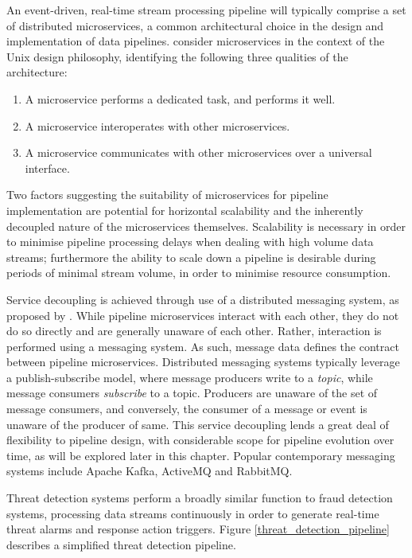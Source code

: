 An event-driven, real-time stream processing pipeline will typically comprise a set of distributed microservices, a common architectural choice in the design and implementation of data pipelines\cite{pipeline_microservices}. \citeauthor{Cerny_microservices} consider microservices in the context of the Unix design philosophy, identifying the following three qualities of the architecture\cite{Cerny_microservices}:

\begin{enumerate}
	\item A microservice performs a dedicated task, and performs it well.
	\item A microservice interoperates with other microservices.
	\item A microservice communicates with other microservices over a universal interface.
\end{enumerate}

Two factors suggesting the suitability of microservices for pipeline implementation are potential for horizontal scalability and the inherently decoupled nature of the microservices themselves\cite{Hasselbring}.  Scalability is necessary in order to minimise pipeline processing delays when dealing with high volume data streams; furthermore the ability to scale down a pipeline is desirable during periods of minimal stream volume, in order to minimise resource consumption.

Service decoupling is achieved through use of a distributed messaging system,  as proposed by  \citeauthor{Nguyen:2005:SRS:1097002.1097015}. While pipeline microservices interact with each other, they do not do so directly and are generally unaware of each other. Rather, interaction is performed using a messaging system. As such, message data defines the contract between pipeline microservices. Distributed messaging systems typically leverage a publish-subscribe model, where message producers write to a \textit{topic}, while message consumers \textit{subscribe} to a topic. Producers are unaware of the set of message consumers, and conversely, the consumer of a message or event is unaware of the producer of same. This service decoupling lends a great deal of flexibility to pipeline design, with considerable scope for pipeline evolution over time, as will be explored later in this chapter. Popular contemporary messaging systems include Apache Kafka\cite{ApacheKafka}, ActiveMQ\cite{ActiveMQ} and RabbitMQ\cite{RabbitMQ}. 

Threat detection systems perform a broadly similar function to fraud detection systems, processing data streams continuously in order to generate real-time threat alarms and response action triggers. 
Figure \ref{threat_detection_pipeline} describes a simplified threat detection pipeline.

